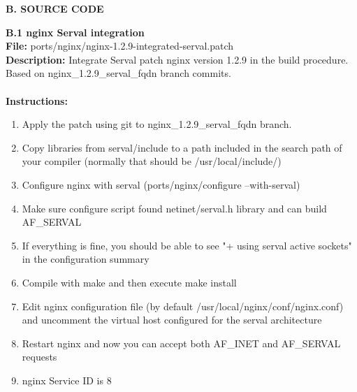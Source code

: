 \newpage
{}
{}
\label{sec:sourcecode}
{\Huge \bf \noindent B. SOURCE CODE}


\newpage
{}
{}
\label{sec:nginxport}
{\huge \bf \noindent B.1 nginx Serval integration}\\[0.5cm]
\textbf{File:} ports/nginx/nginx-1.2.9-integrated-serval.patch\\
\textbf{Description:} Integrate Serval patch nginx version 1.2.9 in the build procedure. Based on nginx\_1.2.9\_serval\_fqdn branch commits.\\\\
\textbf{Instructions: }
\begin{enumerate} \itemsep1pt \parskip0pt 
	\item Apply the patch using git to nginx\_1.2.9\_serval\_fqdn branch.
	\item Copy libraries from serval/include to a path included in the search path of your compiler (normally that should be /usr/local/include/)
	\item Configure nginx with serval (ports/nginx/configure --with-serval)
	\item Make sure configure script found netinet/serval.h library and can build AF\_SERVAL
	\item If everything is fine, you should be able to see "+ using serval active sockets" in the configuration summary
	\item Compile with make and then execute make install
	\item Edit nginx configuration file (by default /usr/local/nginx/conf/nginx.conf) and uncomment the virtual host configured for the serval architecture
	\item Restart nginx and now you can accept both AF\_INET and AF\_SERVAL requests
	\item nginx Service ID is 8\\[0.5cm]
\end{enumerate}


